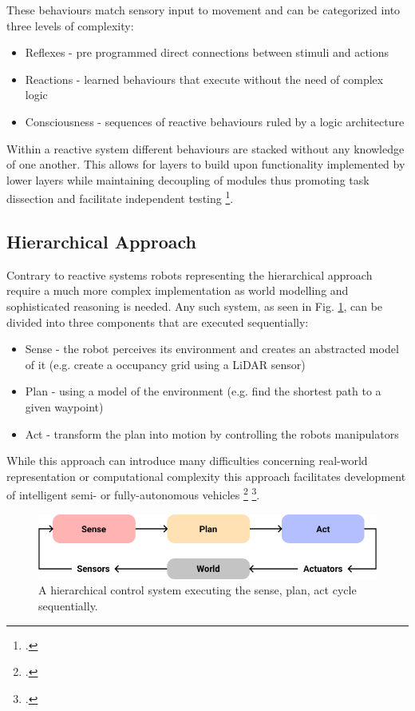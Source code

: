 These behaviours match sensory input to movement and can be categorized into three levels of complexity:
\begin{itemize}
	\item Reflexes - pre programmed direct connections between stimuli and actions
	\item Reactions - learned behaviours that execute without the need of complex logic 
	\item Consciousness - sequences of reactive behaviours ruled by a logic architecture
\end{itemize}

Within a reactive system different behaviours are stacked without any knowledge of one another. This allows for layers to build upon functionality implemented by lower layers while maintaining decoupling of modules thus promoting task dissection and facilitate independent testing \footcite{faigl2017controlParadigms}.


\subsection{Hierarchical Approach}
Contrary to reactive systems robots representing the hierarchical approach require a much more complex implementation as world modelling and sophisticated reasoning is needed. 
Any such system, as seen in Fig. \ref{fig:hierarchicalApproach}, can be divided into three components that are executed sequentially:
\begin{itemize}
	\item Sense - the robot perceives its environment and creates an abstracted model of it (e.g. create a occupancy grid using a LiDAR sensor)
	\item Plan - using a model of the environment (e.g. find the shortest path to a given waypoint)
	\item Act - transform the plan into motion by controlling the robots manipulators
\end{itemize}

While this approach can introduce many difficulties concerning real-world representation or computational complexity this approach facilitates development of intelligent semi- or fully-autonomous vehicles \footcite{faigl2017controlParadigms} \footcite{burgard2020controlParadigms}.

\begin{figure}
	\centering
	\includegraphics[width=0.9\linewidth]{img/hierarchical}
	\caption{
		A hierarchical control system executing the sense, plan, act cycle sequentially.
	}
	\label{fig:hierarchicalApproach}
\end{figure}

